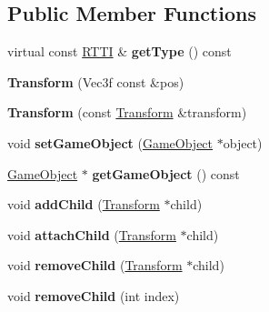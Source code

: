 \subsection*{Public Member Functions}
\begin{DoxyCompactItemize}
\item 
\hypertarget{class_transform_a8fd5df93229c1897055d7c9f0e5021ec}{
virtual const \hyperlink{class_r_t_t_i}{RTTI} \& {\bfseries getType} () const }
\label{class_transform_a8fd5df93229c1897055d7c9f0e5021ec}

\item 
\hypertarget{class_transform_a3f5a7ad019f402b52e5c7fed3699f01f}{
{\bfseries Transform} (Vec3f const \&pos)}
\label{class_transform_a3f5a7ad019f402b52e5c7fed3699f01f}

\item 
\hypertarget{class_transform_aa7a387108cf421888952b454d641895b}{
{\bfseries Transform} (const \hyperlink{class_transform}{Transform} \&transform)}
\label{class_transform_aa7a387108cf421888952b454d641895b}

\item 
\hypertarget{class_transform_a92d05e13bee5846f0895e097d55a0235}{
void {\bfseries setGameObject} (\hyperlink{class_game_object}{GameObject} $\ast$object)}
\label{class_transform_a92d05e13bee5846f0895e097d55a0235}

\item 
\hypertarget{class_transform_a64fefa4ce638359dffa28147d010c88c}{
\hyperlink{class_game_object}{GameObject} $\ast$ {\bfseries getGameObject} () const }
\label{class_transform_a64fefa4ce638359dffa28147d010c88c}

\item 
\hypertarget{class_transform_ad7d487d8508540f04b4caf3f9dd4dad2}{
void {\bfseries addChild} (\hyperlink{class_transform}{Transform} $\ast$child)}
\label{class_transform_ad7d487d8508540f04b4caf3f9dd4dad2}

\item 
\hypertarget{class_transform_a8c40957cdc496f51a993d252bc8fa459}{
void {\bfseries attachChild} (\hyperlink{class_transform}{Transform} $\ast$child)}
\label{class_transform_a8c40957cdc496f51a993d252bc8fa459}

\item 
\hypertarget{class_transform_a9d371d071641600820959f42670502ce}{
void {\bfseries removeChild} (\hyperlink{class_transform}{Transform} $\ast$child)}
\label{class_transform_a9d371d071641600820959f42670502ce}

\item 
\hypertarget{class_transform_add6687cbcdb5e3a586ee8470237f109b}{
void {\bfseries removeChild} (int index)}
\label{class_transform_add6687cbcdb5e3a586ee8470237f109b}


\end{DoxyCompactItemize}

